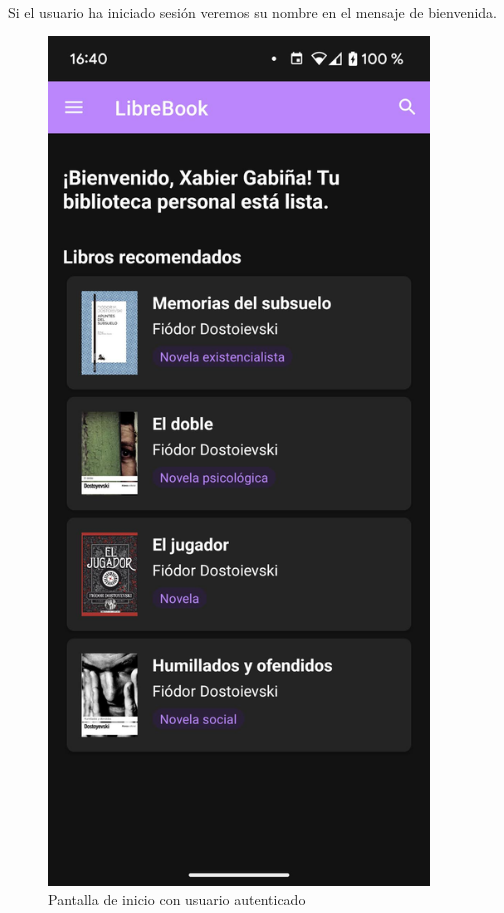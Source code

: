 \documentclass[a4paper,12pt]{report}
\begin{document}
      \vspace{1cm}
      \begin{minipage}{0.6\textwidth}
        \paragraph*{}{
          Si el usuario ha iniciado sesión veremos su nombre en el mensaje de bienvenida.
        }
      \end{minipage}
      \hfill
      \begin{minipage}{0.27\textwidth}
        \begin{figure}[H]
          \centering
          \includegraphics[width=0.9\textwidth]{.img/inicio-auth.png}
          \caption{Pantalla de inicio con usuario autenticado}
          \label{fig:pantalla-inicio-usuario}
        \end{figure}
      \end{minipage}
\end{document}
